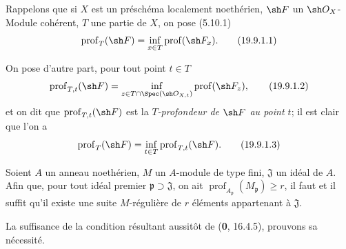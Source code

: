 \begin{env}[19.9.1]
Rappelons que si $X$ est un préschéma localement noethérien, $\sh F$ un $\sh O_X$-Module cohérent, $T$ une partie de $X$, on pose (5.10.1)
\begin{equation}
  \operatorname{prof}_T(\sh F)=\inf_{x\in T}\operatorname{prof}(\sh F_x).
  \tag{19.9.1.1}\label{IV.19.9.1.1}
\end{equation}

On pose d'autre part, pour tout point $t\in T$
\begin{equation}
  \operatorname{prof}_{T,t}(\sh F)=\inf_{z\in T\cap\Spec(\sh O_{X,t})}\operatorname{prof}(\sh F_z),
  \tag{19.9.1.2}\label{IV.19.9.1.2}
\end{equation}
et on dit que $\operatorname{prof}_{T,t}(\sh F)$ est la \emph{$T$-profondeur de $\sh F$ au point $t$}; il est clair que l'on a
\begin{equation}
  \operatorname{prof}_T(\sh F)=\inf_{t\in T}\operatorname{prof}_{T,t}(\sh F).
  \tag{19.9.1.3}\label{IV.19.9.1.3}
\end{equation}
\end{env}

\begin{lemma}[19.9.2]
\label{IV.19.9.2}
Soient $A$ un anneau noethérien, $M$ un $A$-module de type fini, $\mathfrak J$ un idéal de $A$. Afin que, pour tout idéal premier $\mathfrak p\supset\mathfrak J$, on ait $\operatorname{prof}_{A_{\mathfrak p}}(M_{\mathfrak p})\geq r$, il faut et il suffit qu'il existe une suite $M$-régulière de $r$ éléments appartenant à $\mathfrak J$.
\end{lemma}

La suffisance de la condition résultant aussitôt de (\textbf{0}, 16.4.5), prouvons sa nécessité.

